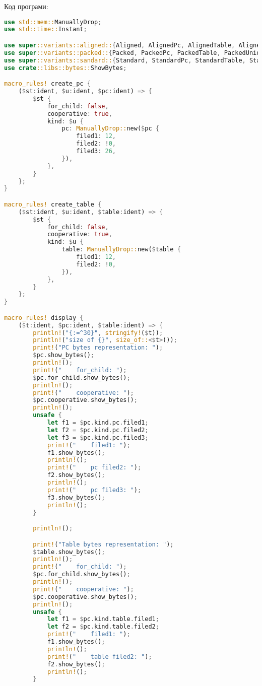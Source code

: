 \noindent
Код програми:
\begin{lstlisting}[language=Rust, style=colouredRust]
use std::mem::ManuallyDrop;
use std::time::Instant;

use super::variants::aligned::{Aligned, AlignedPc, AlignedTable, AlignedUnion};
use super::variants::packed::{Packed, PackedPc, PackedTable, PackedUnion};
use super::variants::sandard::{Standard, StandardPc, StandardTable, StandardUnion};
use crate::libs::bytes::ShowBytes;

macro_rules! create_pc {
    ($st:ident, $u:ident, $pc:ident) => {
        $st {
            for_child: false,
            cooperative: true,
            kind: $u {
                pc: ManuallyDrop::new($pc {
                    filed1: 12,
                    filed2: !0,
                    filed3: 26,
                }),
            },
        }
    };
}

macro_rules! create_table {
    ($st:ident, $u:ident, $table:ident) => {
        $st {
            for_child: false,
            cooperative: true,
            kind: $u {
                table: ManuallyDrop::new($table {
                    filed1: 12,
                    filed2: !0,
                }),
            },
        }
    };
}

macro_rules! display {
    ($t:ident, $pc:ident, $table:ident) => {
        println!("{:=^30}", stringify!($t));
        println!("size of {}", size_of::<$t>());
        print!("PC bytes representation: ");
        $pc.show_bytes();
        println!();
        print!("    for_child: ");
        $pc.for_child.show_bytes();
        println!();
        print!("    cooperative: ");
        $pc.cooperative.show_bytes();
        println!();
        unsafe {
            let f1 = $pc.kind.pc.filed1;
            let f2 = $pc.kind.pc.filed2;
            let f3 = $pc.kind.pc.filed3;
            print!("    filed1: ");
            f1.show_bytes();
            println!();
            print!("    pc filed2: ");
            f2.show_bytes();
            println!();
            print!("    pc filed3: ");
            f3.show_bytes();
            println!();
        }

        println!();

        print!("Table bytes representation: ");
        $table.show_bytes();
        println!();
        print!("    for_child: ");
        $pc.for_child.show_bytes();
        println!();
        print!("    cooperative: ");
        $pc.cooperative.show_bytes();
        println!();
        unsafe {
            let f1 = $pc.kind.table.filed1;
            let f2 = $pc.kind.table.filed2;
            print!("    filed1: ");
            f1.show_bytes();
            println!();
            print!("    table filed2: ");
            f2.show_bytes();
            println!();
        }


\end{lstlisting}
